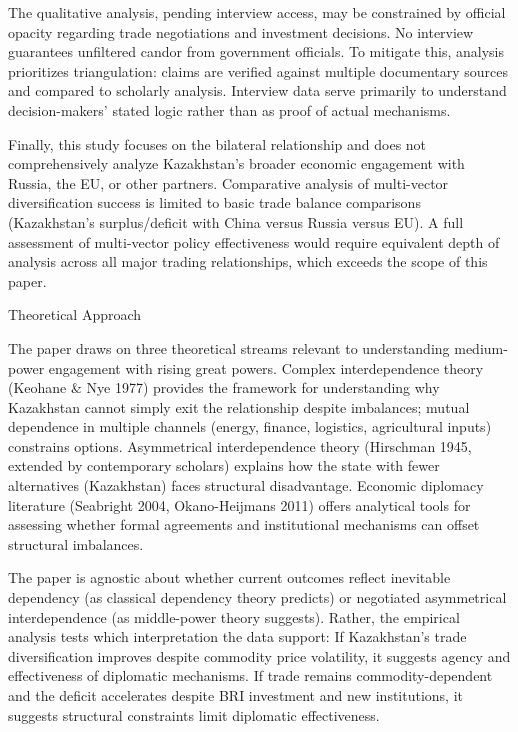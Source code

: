 \documentclass[12pt]{article}
\begin{document}
The qualitative analysis, pending interview access, may be constrained by official opacity regarding trade negotiations and investment decisions. No interview guarantees unfiltered candor from government officials. To mitigate this, analysis prioritizes triangulation: claims are verified against multiple documentary sources and compared to scholarly analysis. Interview data serve primarily to understand decision-makers' stated logic rather than as proof of actual mechanisms.\par
Finally, this study focuses on the bilateral relationship and does not comprehensively analyze Kazakhstan's broader economic engagement with Russia, the EU, or other partners. Comparative analysis of multi-vector diversification success is limited to basic trade balance comparisons (Kazakhstan's surplus/deficit with China versus Russia versus EU). A full assessment of multi-vector policy effectiveness would require equivalent depth of analysis across all major trading relationships, which exceeds the scope of this paper.\par
Theoretical Approach\par
The paper draws on three theoretical streams relevant to understanding medium-power engagement with rising great powers. Complex interdependence theory (Keohane \& Nye 1977) provides the framework for understanding why Kazakhstan cannot simply exit the relationship despite imbalances; mutual dependence in multiple channels (energy, finance, logistics, agricultural inputs) constrains options. Asymmetrical interdependence theory (Hirschman 1945, extended by contemporary scholars) explains how the state with fewer alternatives (Kazakhstan) faces structural disadvantage. Economic diplomacy literature (Seabright 2004, Okano-Heijmans 2011) offers analytical tools for assessing whether formal agreements and institutional mechanisms can offset structural imbalances.\par
The paper is agnostic about whether current outcomes reflect inevitable dependency (as classical dependency theory predicts) or negotiated asymmetrical interdependence (as middle-power theory suggests). Rather, the empirical analysis tests which interpretation the data support: If Kazakhstan's trade diversification improves despite commodity price volatility, it suggests agency and effectiveness of diplomatic mechanisms. If trade remains commodity-dependent and the deficit accelerates despite BRI investment and new institutions, it suggests structural constraints limit diplomatic effectiveness.\par
\end{document}
